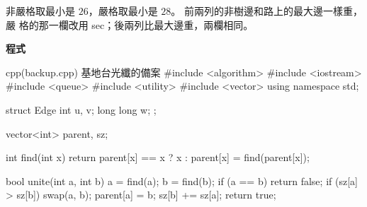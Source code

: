 非嚴格取最小是 $26$，嚴格取最小是 $28$。 前兩列的非樹邊和路上的最大邊一樣重，嚴
格的那一欄改用 sec；後兩列比最大邊重，兩欄相同。

\textbf{程式}

\begin{example}[label=ex:mst-backup]{cpp}{(backup.cpp) 基地台光纖的備案}
#include <algorithm>
#include <iostream>
#include <queue>
#include <utility>
#include <vector>
using namespace std;

struct Edge {
    int u, v;
    long long w;
};

vector<int> parent, sz;

int find(int x) {
    return parent[x] == x ? x : parent[x] = find(parent[x]);
}

bool unite(int a, int b) {
    a = find(a);
    b = find(b);
    if (a == b) {
        return false;
    }
    if (sz[a] > sz[b]) {
        swap(a, b);
    }
    parent[a] = b;
    sz[b] += sz[a];
    return true;
}


\end{example}
